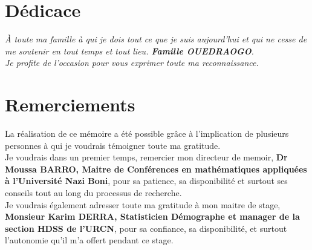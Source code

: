 \documentclass[12pt]{report}
\begin{document}
		\newpage
	
	\renewcommand{\thepage}{\small\roman{page}}
	
	\chapter*{Dédicace}       %
	
	\vspace*{5cm}  %

	\begin{center}
			\textit{À toute ma famille à qui je dois tout ce que je suis aujourd'hui et qui ne cesse de me soutenir en tout temps et tout lieu. \textbf{Famille OUEDRAOGO}.\\
			Je profite de l’occasion pour vous exprimer toute ma reconnaissance.}
	\end{center}	
		
		
	
	\vspace{1.5cm}
	
	\newpage
	
	\chapter*{Remerciements}       %
	
	\vspace*{2cm}
	
	
	La réalisation de ce mémoire a été possible grâce à l'implication de plusieurs personnes à qui
	je voudrais témoigner toute ma gratitude.\\
	
	
	Je voudrais dans un premier temps, remercier mon directeur de memoir, \textbf{Dr Moussa BARRO, Maitre de Conférences en mathématiques appliquées
	à l’Université Nazi Boni}, pour sa patience, sa disponibilité et surtout ses conseils  tout au long du processus de recherche.\\
	
	
	Je voudrais également adresser toute ma gratitude à mon maitre de stage, \textbf{Monsieur Karim DERRA, Statisticien Démographe et manager de la section HDSS de l'URCN}, pour sa confiance, sa disponibilité, et surtout l’autonomie qu’il m’a offert pendant ce stage.\\
	
\end{document}
